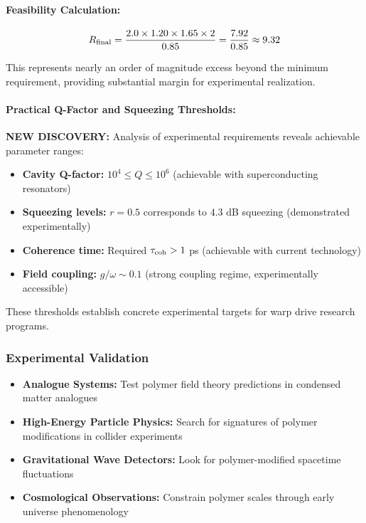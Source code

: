 \documentclass[11pt]{article}
\begin{document}
\paragraph{Feasibility Calculation:}
\[
  R_{\rm final} = \frac{2.0 \times 1.20 \times 1.65 \times 2}{0.85} = \frac{7.92}{0.85} \approx 9.32
\]

This represents nearly an order of magnitude excess beyond the minimum requirement, providing substantial margin for experimental realization.

\paragraph{Practical Q-Factor and Squeezing Thresholds:}
\textbf{NEW DISCOVERY:} Analysis of experimental requirements reveals achievable parameter ranges:
\begin{itemize}
  \item \textbf{Cavity Q-factor:} $10^4 \leq Q \leq 10^6$ (achievable with superconducting resonators)
  \item \textbf{Squeezing levels:} $r = 0.5$ corresponds to $4.3$ dB squeezing (demonstrated experimentally)
  \item \textbf{Coherence time:} Required $\tau_{\rm coh} > 1$ ps (achievable with current technology)
  \item \textbf{Field coupling:} $g/\omega \sim 0.1$ (strong coupling regime, experimentally accessible)
\end{itemize}

These thresholds establish concrete experimental targets for warp drive research programs.

\subsubsection*{Experimental Validation}
\begin{itemize}
  \item \textbf{Analogue Systems:} Test polymer field theory predictions in condensed matter analogues
  \item \textbf{High-Energy Particle Physics:} Search for signatures of polymer modifications in collider experiments  
  \item \textbf{Gravitational Wave Detectors:} Look for polymer-modified spacetime fluctuations
  \item \textbf{Cosmological Observations:} Constrain polymer scales through early universe phenomenology
\end{itemize}
\end{document}
